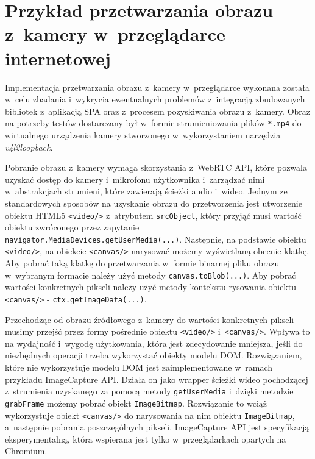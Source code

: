 \section{Przykład przetwarzania obrazu z~kamery w~przeglądarce internetowej}

Implementacja przetwarzania obrazu z~kamery w~przeglądarce wykonana została w~celu zbadania i~wykrycia ewentualnych problemów z~integracją zbudowanych bibliotek z~aplikacją SPA oraz z~procesem pozyskiwania obrazu z~kamery. Obraz na potrzeby testów dostarczany był w~formie strumieniowania plików \lstinline{*.mp4} do wirtualnego urządzenia kamery stworzonego w~wykorzystaniem narzędzia \textit{v4l2loopback}.

Pobranie obrazu z~kamery wymaga skorzystania z~WebRTC API, które pozwala uzyskać dostęp do kamery i~mikrofonu użytkownika i~zarządzać nimi w~abstrakcjach strumieni, które zawierają ścieżki audio i~wideo. Jednym ze standardowych sposobów na uzyskanie obrazu do przetworzenia jest utworzenie obiektu HTML5 \lstinline{<video/>} z~atrybutem \lstinline{srcObject}, który przyjąć musi wartość obiektu zwróconego przez zapytanie \lstinline{navigator.MediaDevices.getUserMedia(...)}. Następnie, na podstawie obiektu \lstinline{<video/>}, na obiekcie \lstinline{<canvas/>} narysować możemy wyświetlaną obecnie klatkę. Aby pobrać taką klatkę do przetwarzania w~formie binarnej pliku obrazu w~wybranym formacie należy użyć metody \lstinline{canvas.toBlob(...)}. Aby pobrać wartości konkretnych pikseli należy użyć metody kontekstu rysowania obiektu \lstinline{<canvas/>} - \lstinline{ctx.getImageData(...)}. 

Przechodząc od obrazu źródłowego z~kamery do wartości konkretnych pikseli musimy przejść przez formy pośrednie obiektu \lstinline{<video/>} i~\lstinline{<canvas/>}. Wpływa to na wydajność i~wygodę użytkowania, która jest zdecydowanie mniejsza, jeśli do niezbędnych operacji trzeba wykorzystać obiekty modelu DOM. Rozwiązaniem, które nie wykorzystuje modelu DOM jest zaimplementowane w~ramach przykładu ImageCapture API. Działa on jako wrapper ścieżki wideo pochodzącej z~strumienia uzyskanego za pomocą metody \lstinline{getUserMedia} i~dzięki metodzie \lstinline{grabFrame} możemy pobrać obiekt \lstinline{ImageBitmap}. Rozwiązanie to wciąż wykorzystuje obiekt \lstinline{<canvas/>} do narysowania na nim obiektu \lstinline{ImageBitmap}, a~następnie pobrania poszczególnych pikseli. ImageCapture API jest specyfikacją eksperymentalną, która wspierana jest tylko w~przeglądarkach opartych na Chromium.

